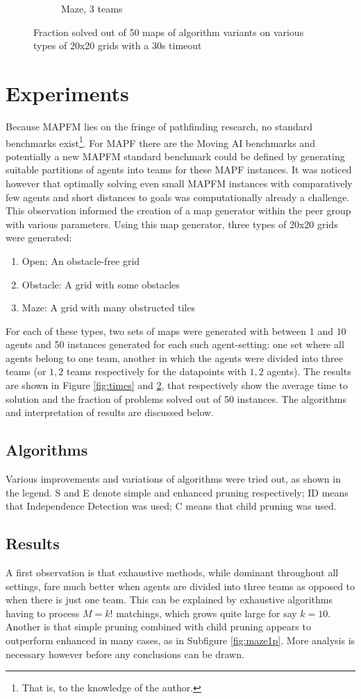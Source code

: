 \documentclass[english]{article}
\begin{document}
\begin{figure}
\begin{subfigure}{0.49\textwidth}
			\caption{Maze, 3 teams}
			\label{fig:maze3p}
		\end{subfigure}
		\caption{Fraction solved out of 50 maps of algorithm variants on various types of 20x20 grids with a 30s timeout}
		\label{fig:probs}
	\end{figure}
	
	\section{Experiments}
	Because MAPFM lies on the fringe of pathfinding research, no standard benchmarks exist\footnote{That is, to the knowledge of the author.}. For MAPF there are the Moving AI benchmarks \cite{sturtevant2012} and potentially a new MAPFM standard benchmark could be defined by generating suitable partitions of agents into teams for these MAPF instances. It was noticed however that optimally solving even small MAPFM instances with comparatively few agents and short distances to goals was computationally already a challenge. This observation informed the creation of a map generator within the peer group with various parameters. Using this map generator, three types of 20x20 grids were generated:
	\begin{enumerate}
		\item Open: An obstacle-free grid
		\item Obstacle: A grid with some obstacles
		\item Maze: A grid with many obstructed tiles
	\end{enumerate}
	For each of these types, two sets of maps were generated with between $1$ and $10$ agents and 50 instances generated for each such agent-setting: one set where all agents belong to one team, another in which the agents were divided into three teams (or $1,2$ teams respectively for the datapoints with $1,2$ agents). The results are shown in Figure \ref{fig:times} and \ref{fig:probs}, that respectively show the average time to solution and the fraction of problems solved out of 50 instances. The algorithms and interpretation of results are discussed below.
	\subsection{Algorithms}
	Various improvements and variations of algorithms were tried out, as shown in the legend. S and E denote simple and enhanced pruning respectively; ID means that Independence Detection was used; C means that child pruning was used.
	\subsection{Results}
	A first observation is that exhaustive methods, while dominant throughout all settings, fare much better when agents are divided into three teams as opposed to when there is just one team. This can be explained by exhaustive algorithms having to process $M = k!$ matchings, which grows quite large for say $k = 10$. Another is that simple pruning combined with child pruning appears to outperform enhanced in many cases, as in Subfigure \ref{fig:maze1p}. More analysis is necessary however before any conclusions can be drawn.
	
\end{document}
